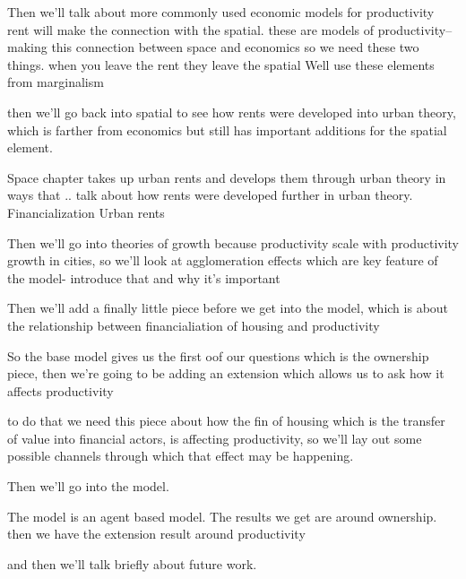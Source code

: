 Then we'll talk about more commonly used economic models for productivity
rent will make the connection with the spatial. 
these are models of productivity-- making this connection between space and economics so we need these two things.
when you leave the rent they leave the spatial
Well use these elements from marginalism


then we'll go back into spatial to see how rents were developed into urban theory, which is farther from economics but still has important additions for the spatial element. 

Space chapter takes up urban rents and develops them through urban theory in ways that .. talk about how rents were developed further in urban theory.
Financialization
Urban rents

Then we'll go into theories of growth because productivity scale with productivity growth in cities, so we'll look at agglomeration effects which are key feature of the model- introduce that and why it's important

Then we'll add a finally little piece before we get  into the model,  which is about the relationship between financialiation of housing and productivity


So the base model gives us the first oof our questions which is the ownership piece, then we're going to be adding an extension which allows us to ask how it affects productivity

to do that we need this piece about how the fin of housing which is the transfer of value into financial actors, is affecting productivity, so we'll lay out some possible channels through which that effect may be happening.

Then we'll go into the model. 

The model is an agent based model. The results we get  are around ownership. then we have the extension result around productivity

and then we'll talk briefly about future work. 
